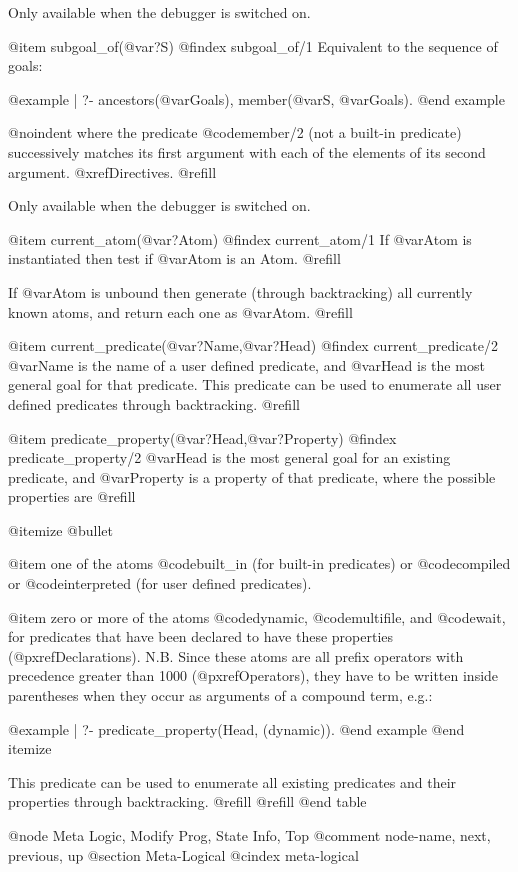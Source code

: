 Only available when the debugger is switched on.

@item subgoal_of(@var{?S})
@findex subgoal_of/1
Equivalent to the sequence of goals:  

@example
| ?- ancestors(@var{Goals}), member(@var{S}, @var{Goals}).
@end example

@noindent
where the predicate @code{member/2} (not a built-in predicate)
successively matches its first argument with each of the elements of its
second argument.  @xref{Directives}. @refill

Only available when the debugger is switched on.

@item current_atom(@var{?Atom})
@findex current_atom/1
If @var{Atom} is instantiated then test if @var{Atom} is an Atom. @refill

If @var{Atom} is unbound then generate (through backtracking) all currently
known atoms, and return each one as @var{Atom}. @refill

@item current_predicate(@var{?Name},@var{?Head})
@findex current_predicate/2
@var{Name} is the name of a user defined predicate, and @var{Head} is
the most general goal for that predicate.  This predicate can
be used to enumerate all user defined predicates through backtracking.
@refill

@item predicate_property(@var{?Head},@var{?Property})
@findex predicate_property/2
@var{Head} is the most general goal for an existing predicate,
and @var{Property} is a property of that predicate, where the possible
properties are @refill

@itemize @bullet

@item
one of the atoms @code{built_in} (for built-in predicates) or
@code{compiled} or @code{interpreted} (for user defined predicates).

@item
zero or more of the atoms @code{dynamic}, @code{multifile}, and
@code{wait}, for predicates that have been declared to have these
properties (@pxref{Declarations}).  N.B.  Since these atoms are all
prefix operators with precedence greater than 1000 (@pxref{Operators}),
they have to be written inside parentheses when they occur as arguments
of a compound term, e.g.:

@example
| ?- predicate_property(Head, (dynamic)).
@end example
@end itemize

This predicate can be used to enumerate all existing predicates and
their properties through backtracking. @refill
@refill
@end table

@node Meta Logic, Modify Prog, State Info, Top
@comment  node-name,  next,  previous,  up
@section Meta-Logical
@cindex meta-logical

